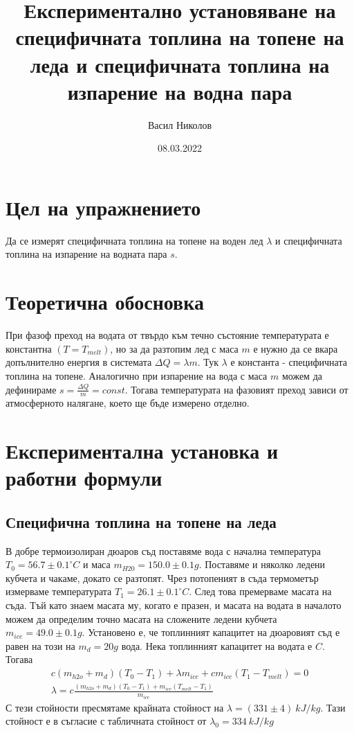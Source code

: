 \documentclass[
 reprint,
 amsmath,amssymb,
 aps,
]{revtex4-2}
\begin{document}
\setlength{\abovedisplayskip}{10pt}
\setlength{\belowdisplayskip}{10pt}    

\title{Експериментално установяване на специфичната топлина на топене на леда и специфичната топлина на изпарение на водна пара}
\author{Васил Николов}
\date{08.03.2022}
\maketitle

\section{Цел на упражнението}
Да се измерят специфичната топлина на топене на воден лед $\lambda$ и специфичната топлина на изпарение на водната пара $s$. 

\section{Теоретична обосновка}

При фазоф преход на водата от твърдо към течно състояние температурата е константна $(T = T_{melt})$, но за да разтопим лед с маса $m$ е нужно да се вкара допълнително енергия в системата $\Delta Q = \lambda m$. Тук $\lambda$ е константа - специфичната топлина на топене. Аналогично при изпарение на вода с маса $m$ можем да дефинираме $s = \frac{\Delta Q}{m} = const$. Тогава температурата на фазовият преход зависи от атмосферното налягане, което ще бъде измерено отделно. 

\section{Експериментална установка и работни формули}

\subsection{Специфична топлина на топене на леда}
В добре термоизолиран дюаров съд поставяме вода с начална температура $T_0 = 56.7 \pm 0.1 ^{\circ}C $ и маса $m_{H20} = 150.0 \pm 0.1 g$. Поставяме и няколко ледени кубчета и чакаме, докато се разтопят. Чрез потопеният в съда термометър измерваме температурата $T_1 = 26.1 \pm 0.1 ^{\circ}C $. След това премерваме масата на съда. Тъй като знаем масата му, когато е празен, и масата на водата в началото можем да определим точно масата на сложените ледени кубчета $m_{ice} = 49.0 \pm 0.1 g$. Установено е, че топлинният капацитет на дюаровият съд е равен на този на $m_d = 20g$ вода. Нека топлинният капацитет на водата е $C$. Тогава
\begin{gather*}
    c(m_{h2o} + m_d)(T_0 - T_1) + \lambda m_{ice} + c m_{ice} (T_1 - T_{melt}) = 0 \\
    \lambda = c \frac{(m_{h2o} + m_d)(T_0 - T_1) + m_{ice}(T_{melt} - T_1)}{m_{ice}}
\end{gather*}
С тези стойности пресмятаме крайната стойност на $\lambda = (331 \pm 4) \ kJ/kg$. Тази стойност е в съгласие с табличната стойност от $\lambda_0 = 334 \ kJ/kg$
\end{document}
